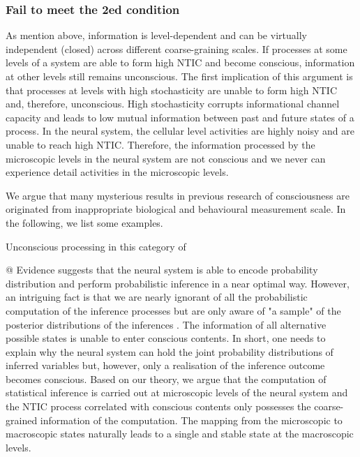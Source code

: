 \documentclass[utf8]{article}
\begin{document}
        \subsubsection*{Fail to meet the 2\lowercase{ed} condition}
        As mention above, information is level-dependent and can be virtually independent (closed) across different coarse-graining scales. If processes at some levels of a system are able to form high NTIC and become conscious, information at other levels still remains unconscious. The first implication of this argument is that processes at levels with high stochasticity are unable to form high NTIC and, therefore, unconscious. High stochasticity corrupts informational channel capacity and leads to low mutual information between past and future states of a process. In the neural system, the cellular level activities are highly noisy and are unable to reach high NTIC. Therefore, the information processed by the microscopic levels in the neural system are not conscious and we never can experience detail activities in the microscopic levels. 
        
        
        We argue that many mysterious results in previous research of consciousness are originated from inappropriate biological and behavioural measurement scale. In the following, we list some examples. 
        
        
        Unconscious processing in this category of 
        
        @ Evidence suggests that the neural system is able to encode probability distribution and perform probabilistic inference in a near optimal way. However, an intriguing fact is that we are nearly ignorant of all the probabilistic computation of the inference processes but are only aware of "a sample" of the posterior distributions of the inferences \citep{dehaene2017consciousness, vul2009attention, asplund2014attentional, vul2008temporal, moreno2011bayesian}. The information of all alternative possible states is unable to enter conscious contents. In short, one needs to explain why the neural system can hold the joint probability distributions of inferred variables but, however, only a realisation of the inference outcome becomes conscious. Based on our theory, we argue that the computation of statistical inference is carried out at microscopic levels of the neural system and the NTIC process correlated with conscious contents only possesses the coarse-grained information of the computation. The mapping from the microscopic to macroscopic states naturally leads to a single and stable state at the macroscopic levels.
        
\end{document}
